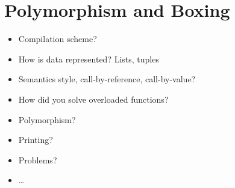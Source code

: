 \section{Polymorphism and Boxing} \label{sec:polymorphism-boxing}







\begin{itemize}
	\item Compilation scheme?
	\item How is data represented? Lists, tuples
	\item Semantics style, call-by-reference, call-by-value?
	\item How did you solve overloaded functions?
	\item Polymorphism?
	\item Printing?
	\item Problems?
	\item\ldots
\end{itemize}
